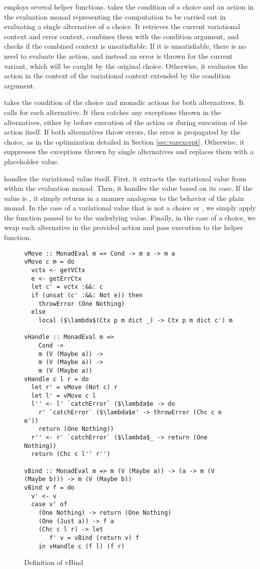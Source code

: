 \documentclass[12pt,oneside]{book}
\begin{document}
 employs several helper functions.  takes the condition of a choice and an action in the evaluation monad representing the
computation to be carried out in evaluating a single alternative of a choice. It retrieves the current variational context and error context,
combines them with the condition argument,
and checks if the combined context is unsatisfiable. If it is unsatisfiable, there is no need to evaluate the action, and instead an error is
thrown for the current variant, which will be caught by the original choice. Otherwise, it evaluates the action in the context of
the variational context extended by the condition argument.

 takes the condition of the choice and monadic actions for both alternatives. It calls  for each alternative.
It then catches any exceptions thrown in the alternatives, either by  before execution of the action or during execution of the action
itself. If both alternatives throw errors, the error is propagated by the choice, as in the optimization detailed in Section \ref{sec:varexcept}. Otherwise,
it suppresses the exceptions thrown by single alternatives and replaces them with a placeholder  value.

 handles the variational value itself. First, it extracts the variational value from within the evaluation monad. Then, it handles
the value based on its case. If the value is , it simply returns  in a manner analogous to the behavior
of the plain  monad. In the case of a variational value that is not a choice or , we simply apply the function
passed to  to the underlying value. Finally, in the case of a choice, we wrap each alternative in the provided action
and pass execution to the  helper function.

\begin{figure}
\begin{lstlisting}
vMove :: MonadEval m => Cond -> m a -> m a
vMove c m = do
  vctx <- getVCtx
  e <- getErrCtx
  let c' = vctx :&&: c
  if (unsat (c' :&&: Not e)) then
    throwError (One Nothing)
  else
    local ($\lambda$(Ctx p m dict _) -> Ctx p m dict c') m

vHandle :: MonadEval m =>
    Cond -> 
    m (V (Maybe a)) -> 
    m (V (Maybe a)) -> 
    m (V (Maybe a))
vHandle c l r = do
  let r' = vMove (Not c) r
  let l' = vMove c l
  l'' <- l' `catchError` ($\lambda$e -> do
    r' `catchError` ($\lambda$e' -> throwError (Chc c e e'))
    return (One Nothing))
  r'' <- r' `catchError` ($\lambda$_ -> return (One Nothing))
  return (Chc c l'' r'')

vBind :: MonadEval m => m (V (Maybe a)) -> (a -> m (V (Maybe b))) -> m (V (Maybe b))
vBind v f = do
  v' <- v
  case v' of
    (One Nothing) -> return (One Nothing)
    (One (Just a)) -> f a
    (Chc c l r) -> let
       f' v = vBind (return v) f
    in vHandle c (f l) (f r)
\end{lstlisting}
\caption{Definition of vBind}
\label{fig:vbind}
\end{figure}
\end{document}

